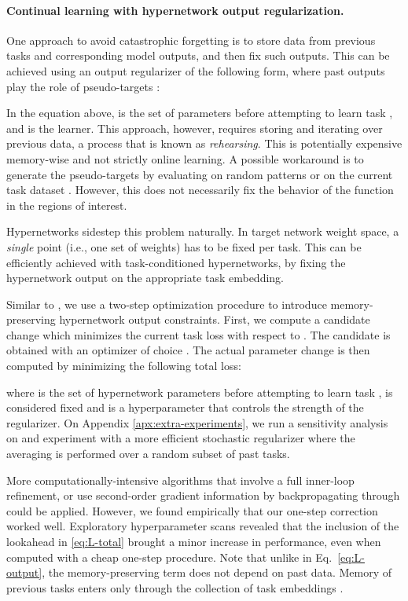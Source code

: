 \documentclass{article}
\begin{document}
\vspace{-3mm}
\paragraph{Continual learning with hypernetwork output regularization.} One approach to avoid catastrophic forgetting is to store data from previous tasks and corresponding model outputs, and then fix such outputs. This can be achieved using an output regularizer of the following form, where past outputs play the role of pseudo-targets \citep{robins_catastrophic_1995,li_learning_2018,benjamin_measuring_2018}:

In the equation above,  is the set of parameters before attempting to learn task , and  is the learner. This approach, however, requires storing and iterating over previous data, a process that is known as \emph{rehearsing}. This is potentially expensive memory-wise and not strictly online learning. A possible workaround is to generate the pseudo-targets by evaluating  on random patterns \citep{robins_catastrophic_1995} or on the current task dataset \citep{li_learning_2018}. However, this does not necessarily fix the behavior of the function  in the regions of interest.

Hypernetworks sidestep this problem naturally. In target network weight space, a \emph{single} point (i.e., one set of weights) has to be fixed per task. This can be efficiently achieved with task-conditioned hypernetworks, by fixing the hypernetwork output on the appropriate task embedding.

Similar to \citet{benjamin_measuring_2018}, we use a two-step optimization procedure to introduce memory-preserving hypernetwork output constraints. First, we compute a candidate change  which minimizes the current task loss  with respect to . The candidate  is obtained with an optimizer of choice \citep[we use Adam throughout;][]{kingma_adam:_2015}. The actual parameter change is then computed by minimizing the following total loss:

where  is the set of hypernetwork parameters before attempting to learn task ,  is considered fixed and  is a hyperparameter that controls the strength of the regularizer. On Appendix \ref{apx:extra-experiments}, we run a sensitivity analysis on  and experiment with a more efficient stochastic regularizer where the averaging is performed over a random subset of past tasks.

More computationally-intensive algorithms that involve a full inner-loop refinement, or use second-order gradient information by backpropagating through  could be applied. However, we found empirically that our one-step correction worked well. Exploratory hyperparameter scans revealed that the inclusion of the lookahead  in \eqref{eq:L-total} brought a minor increase in performance, even when computed with a cheap one-step procedure. Note that unlike in Eq.~\ref{eq:L-output}, the memory-preserving term  does not depend on past data. Memory of previous tasks enters only through the collection of task embeddings .
\end{document}
